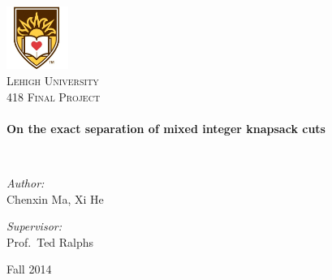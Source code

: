 \begin{titlepage}
\begin{center}


\includegraphics[width=0.15\textwidth]{lehigh.jpg}~\\[1cm]

\textsc{\LARGE Lehigh University}\\[1.5cm]

\textsc{\Large 418 Final Project}\\[0.5cm]

\HRule \\[0.4cm]
{ \Large \bfseries On the exact separation of mixed integer knapsack cuts\\[0.4cm] }

\HRule \\[1.5cm]

\noindent
\begin{minipage}{0.4\textwidth}
\begin{flushleft} \large
\emph{Author:}\\
Chenxin Ma, Xi He
\end{flushleft}
\end{minipage}%
\begin{minipage}{0.4\textwidth}
\begin{flushright} \large
\emph{Supervisor:} \\
Prof.~Ted Ralphs
\end{flushright}
\end{minipage}

\vfill

{\Large Fall 2014}

\end{center}
\end{titlepage}